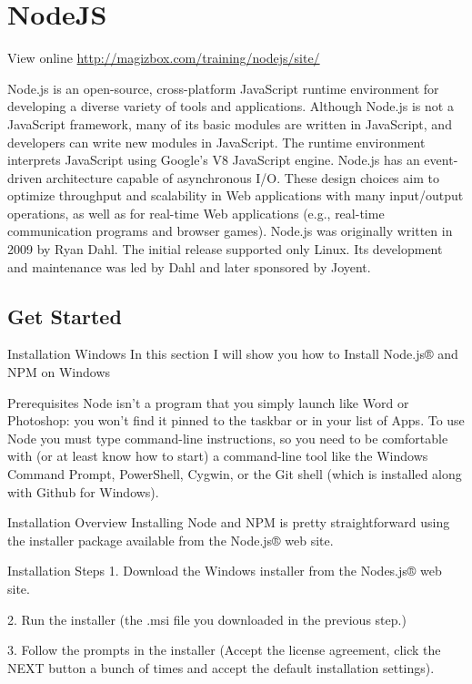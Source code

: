 \chapter{NodeJS}

View online \href{http://magizbox.com/training/nodejs/site/}{http://magizbox.com/training/nodejs/site/}

Node.js is an open-source, cross-platform JavaScript runtime environment for developing a diverse variety of tools and applications. Although Node.js is not a JavaScript framework, many of its basic modules are written in JavaScript, and developers can write new modules in JavaScript. The runtime environment interprets JavaScript using Google's V8 JavaScript engine. Node.js has an event-driven architecture capable of asynchronous I/O. These design choices aim to optimize throughput and scalability in Web applications with many input/output operations, as well as for real-time Web applications (e.g., real-time communication programs and browser games). Node.js was originally written in 2009 by Ryan Dahl. The initial release supported only Linux. Its development and maintenance was led by Dahl and later sponsored by Joyent.

\section{Get Started}

Installation
Windows
In this section I will show you how to Install Node.js® and NPM on Windows

Prerequisites
Node isn’t a program that you simply launch like Word or Photoshop: you won’t find it pinned to the taskbar or in your list of Apps. To use Node you must type command-line instructions, so you need to be comfortable with (or at least know how to start) a command-line tool like the Windows Command Prompt, PowerShell, Cygwin, or the Git shell (which is installed along with Github for Windows).

Installation Overview
Installing Node and NPM is pretty straightforward using the installer package available from the Node.js® web site.

Installation Steps
1. Download the Windows installer from the Nodes.js® web site.

2. Run the installer (the .msi file you downloaded in the previous step.)

3. Follow the prompts in the installer (Accept the license agreement, click the NEXT button a bunch of times and accept the default installation settings).



